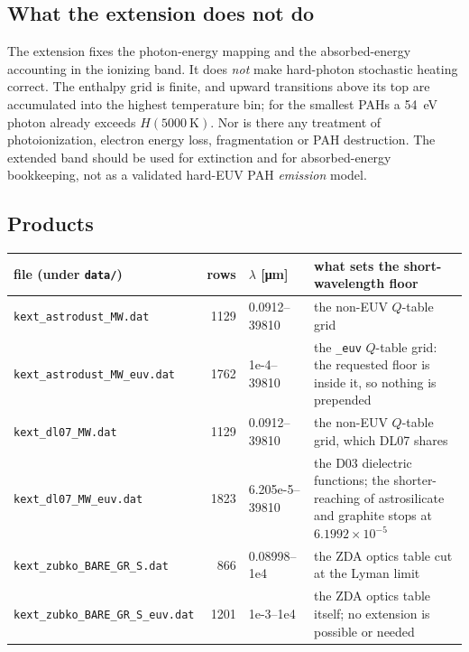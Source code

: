 \documentclass{my_memo}
\begin{document}
\subsection{What the extension does not do}

The extension fixes the photon-energy mapping and the absorbed-energy
accounting in the ionizing band. It does \emph{not} make hard-photon
stochastic heating correct. The enthalpy grid is finite, and upward
transitions above its top are accumulated into the highest temperature
bin; for the smallest PAHs a \SI{54}{\electronvolt} photon already
exceeds $H(\SI{5000}{\kelvin})$. Nor is there any treatment of
photoionization, electron energy loss, fragmentation or PAH
destruction. The extended band should be used for extinction and for
absorbed-energy bookkeeping, not as a validated hard-EUV PAH
\emph{emission} model.

\subsection{Products}

\begin{tabularx}{0.98\textwidth}{@{}l r l X@{}}
\toprule
file (under \texttt{data/}) & rows & $\lambda$ [\si{\micro\meter}] &
what sets the short-wavelength floor \\
\midrule
\texttt{kext\_astrodust\_MW.dat} & 1129 & 0.0912--39810 &
the non-EUV $Q$-table grid \\
\texttt{kext\_astrodust\_MW\_euv.dat} & 1762 & 1e-4--39810 &
the \texttt{\_euv} $Q$-table grid: the requested floor is inside it, so
nothing is prepended \\
\texttt{kext\_dl07\_MW.dat} & 1129 & 0.0912--39810 &
the non-EUV $Q$-table grid, which DL07 shares \\
\texttt{kext\_dl07\_MW\_euv.dat} & 1823 & 6.205e-5--39810 &
the D03 dielectric functions; the shorter-reaching of astrosilicate and
graphite stops at $6.1992\times10^{-5}$ \\
\texttt{kext\_zubko\_BARE\_GR\_S.dat} & 866 & 0.08998--1e4 &
the ZDA optics table cut at the Lyman limit \\
\texttt{kext\_zubko\_BARE\_GR\_S\_euv.dat} & 1201 & 1e-3--1e4 &
the ZDA optics table itself; no extension is possible or needed \\
\bottomrule
\end{tabularx}
\end{document}
